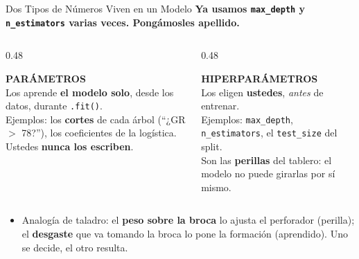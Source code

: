 \documentclass[aspectratio=169, 11pt]{beamer}
\begin{document}
\begin{frame}[shrink=8]{Dos Tipos de Números Viven en un Modelo}
  \vspace{-4pt}
  {\small\color{arcaDark}\bfseries
    Ya usamos \texttt{max\_depth} y \texttt{n\_estimators} varias veces. Pongámosles apellido.}

  \vspace{8pt}
  \begin{columns}[T]
    \begin{column}{0.48\textwidth}
      \begin{tcolorbox}[colback=arcaGray, colframe=codeGreen, boxrule=0pt, leftrule=3pt,
        arc=3pt, left=6pt, right=6pt, top=5pt, bottom=5pt]
        {\scriptsize\color{codeGreen}\bfseries\faCogs\hspace{4pt}PARÁMETROS}\\[4pt]
        {\scriptsize\color{textMuted}
          Los aprende \textbf{el modelo solo}, desde los datos,
          durante \texttt{.fit()}.\\[3pt]
          Ejemplos: los \textbf{cortes} de cada árbol
          (``¿GR \(>\) 78?''), los coeficientes de la logística.\\[3pt]
          Ustedes \textbf{nunca los escriben}.}
      \end{tcolorbox}
    \end{column}
    \begin{column}{0.48\textwidth}
      \begin{tcolorbox}[colback=arcaGray, colframe=arcaRed, boxrule=0pt, leftrule=3pt,
        arc=3pt, left=6pt, right=6pt, top=5pt, bottom=5pt]
        {\scriptsize\color{arcaRed}\bfseries\faSlidersH\hspace{4pt}HIPERPARÁMETROS}\\[4pt]
        {\scriptsize\color{textMuted}
          Los eligen \textbf{ustedes}, \emph{antes} de entrenar.\\[3pt]
          Ejemplos: \texttt{max\_depth}, \texttt{n\_estimators},
          el \texttt{test\_size} del split.\\[3pt]
          Son las \textbf{perillas} del tablero: el modelo no puede
          girarlas por sí mismo.}
      \end{tcolorbox}
    \end{column}
  \end{columns}

  \vspace{10pt}
  {\footnotesize\color{textMuted}
  \begin{itemize}\setlength{\itemsep}{3pt}
    \item[{\color{arcaRed}\scriptsize\faArrowRight}]
      Analogía de taladro: el \textbf{peso sobre la broca} lo ajusta el perforador
      (perilla); el \textbf{desgaste} que va tomando la broca lo pone la formación
      (aprendido). Uno se decide, el otro resulta.
  \end{itemize}
  }
\end{frame}
\end{document}
